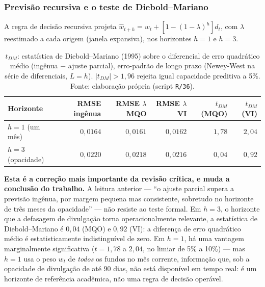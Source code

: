 \documentclass[12pt,a4paper]{article}
\begin{document}
\subsubsection{Previsão recursiva e o teste de Diebold--Mariano}

A regra de decisão recursiva projeta $\widehat{w}_{t+h}=w_t+[1-(1-\lambda)^h]d_t$, com $\lambda$
reestimado a cada origem (janela expansiva), nos horizontes $h=1$ e $h=3$.

\begin{table}[h]\centering\small
\caption{Previsão recursiva fora da amostra: RMSE e teste de Diebold--Mariano contra a previsão
ingênua.}
\label{tab:dm}
\begin{tabular}{@{}lrrrrr@{}}
\toprule
Horizonte & RMSE ingênua & RMSE $\lambda$ MQO & RMSE $\lambda$ VI & $t_{DM}$ (MQO) & $t_{DM}$ (VI) \\
\midrule
$h=1$ (um mês)     & $0{,}0164$ & $0{,}0161$ & $0{,}0162$ & $1{,}78$ & $2{,}04$ \\
$h=3$ (opacidade)  & $0{,}0220$ & $0{,}0218$ & $0{,}0216$ & $0{,}04$ & $0{,}92$ \\
\bottomrule
\end{tabular}
\caption*{\footnotesize $t_{DM}$: estatística de Diebold--Mariano (1995) sobre o diferencial de
erro quadrático médio (ingênua $-$ ajuste parcial), erro-padrão de longo prazo (Newey-West na
série de diferenciais, $L=h$). $|t_{DM}|>1{,}96$ rejeita igual capacidade preditiva a 5\%. Fonte:
elaboração própria (script \texttt{R/36}).}
\end{table}

\textbf{Esta é a correção mais importante da revisão crítica, e muda a conclusão do trabalho.} A
leitura anterior --- ``o ajuste parcial supera a previsão ingênua, por margem pequena mas
consistente, sobretudo no horizonte de três meses da opacidade'' --- não resiste ao teste formal.
Em $h=3$, o horizonte que a defasagem de divulgação torna operacionalmente relevante, a
estatística de Diebold--Mariano é $0{,}04$ (MQO) e $0{,}92$ (VI): a diferença de erro quadrático
médio é estatisticamente indistinguível de zero. Em $h=1$, há uma vantagem marginalmente
significativa ($t=1{,}78$ a $2{,}04$, no limiar de 5\% a 10\%) --- mas $h=1$ usa o peso $w_t$ de
\emph{todos} os fundos no mês corrente, informação que, sob a opacidade de divulgação de até 90
dias, não está disponível em tempo real: é um horizonte de referência acadêmica, não uma regra de
decisão operável.
\end{document}
